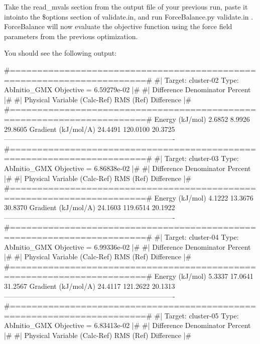 Take the {\ttfamily read\+\_\+mvals} section from the output file of your previous run, paste it intointo the {\ttfamily \$options} section of {\ttfamily validate.\+in}, and run {\ttfamily Force\+Balance.\+py validate.\+in} . Force\+Balance will now evaluate the objective function using the force field parameters from the previous optimization.

You should see the following output\+:

\begin{DoxyVerb} #=======================================================================#
 #|  Target: cluster-02 Type: AbInitio_GMX Objective = 6.59279e-02      |#
 #|                              Difference   Denominator     Percent   |#
 #|  Physical Variable           (Calc-Ref)     RMS (Ref)   Difference  |#
 #=======================================================================#
     Energy (kJ/mol)                 2.6852        8.9926     29.8605%
     Gradient (kJ/mol/A)            24.4491      120.0100     20.3725%
 -------------------------------------------------------------------------
 #=======================================================================#
 #|  Target: cluster-03 Type: AbInitio_GMX Objective = 6.86838e-02      |#
 #|                              Difference   Denominator     Percent   |#
 #|  Physical Variable           (Calc-Ref)     RMS (Ref)   Difference  |#
 #=======================================================================#
     Energy (kJ/mol)                 4.1222       13.3676     30.8370%
     Gradient (kJ/mol/A)            24.1603      119.6514     20.1922%
 -------------------------------------------------------------------------
 #=======================================================================#
 #|  Target: cluster-04 Type: AbInitio_GMX Objective = 6.99336e-02      |#
 #|                              Difference   Denominator     Percent   |#
 #|  Physical Variable           (Calc-Ref)     RMS (Ref)   Difference  |#
 #=======================================================================#
     Energy (kJ/mol)                 5.3337       17.0641     31.2567%
     Gradient (kJ/mol/A)            24.4117      121.2622     20.1313%
 -------------------------------------------------------------------------
 #=======================================================================#
 #|  Target: cluster-05 Type: AbInitio_GMX Objective = 6.83413e-02      |#
 #|                              Difference   Denominator     Percent   |#
 #|  Physical Variable           (Calc-Ref)     RMS (Ref)   Difference  |#

\end{DoxyVerb}
